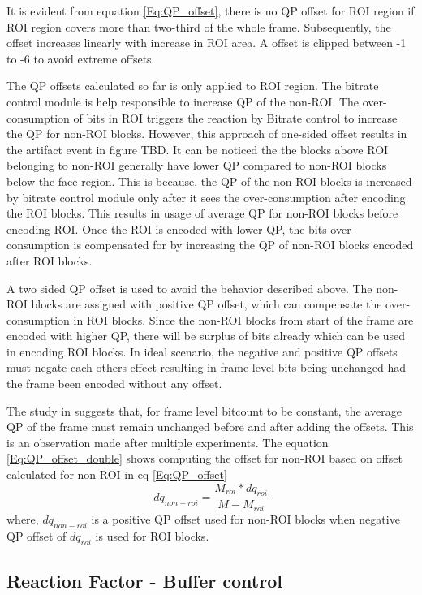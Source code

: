 \documentclass[11pt]{article} %
\begin{document}
It is evident from equation \ref{Eq:QP_offset}, there is no QP offset for ROI region if ROI region covers more than two-third of the whole frame. Subsequently, the offset increases linearly with increase in ROI area. A offset is clipped between -1 to -6 to avoid extreme offsets.

The QP offsets calculated so far is only applied to ROI region. The bitrate control module is help responsible to increase QP of the non-ROI. The over-consumption of bits in ROI triggers the reaction by Bitrate control to increase the QP for non-ROI blocks. However, this approach of one-sided offset results in the artifact event in figure TBD. It can be noticed the the blocks above ROI belonging to non-ROI generally have lower QP compared to non-ROI blocks below the face region. This is because, the QP of the non-ROI blocks is increased by bitrate control module only after it sees the over-consumption after encoding the ROI blocks. This results in usage of average QP for non-ROI blocks before encoding ROI. Once the ROI is encoded with lower QP, the bits over-consumption is compensated for by increasing the QP of non-ROI blocks encoded after ROI blocks.

A two sided QP offset is used to avoid the behavior described above. The non-ROI blocks are assigned with positive QP offset, which can compensate the over-consumption in ROI blocks. Since the non-ROI blocks from start of the frame are encoded with higher QP, there will be surplus of bits already which can be used in encoding ROI blocks. In ideal scenario, the negative and positive QP offsets must negate each others effect resulting in frame level bits being unchanged had the frame been encoded without any offset.

The study in \cite{ROI-Coding-paper} suggests that, for frame level bitcount to be constant, the average QP of the frame must remain unchanged before and after adding the offsets. This is an observation made after multiple experiments. The equation \ref{Eq:QP_offset_double} shows computing the offset for non-ROI based on offset calculated for non-ROI in eq \ref{Eq:QP_offset}
\begin{equation}
	\label{Eq:QP_offset_double}
		dq_{non-roi} = \frac{M_{roi} * dq_{roi}}{M - M_{roi}}
\end{equation}
where, $dq_{non-roi}$ is a positive QP offset used for non-ROI blocks when negative QP offset of $dq_{roi}$ is used for ROI blocks. 
\subsection{Reaction Factor - Buffer control} 
\end{document}
